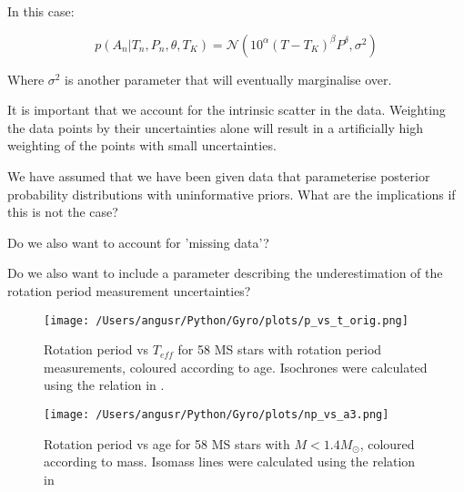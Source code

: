 \documentclass[12pt,preprint]{aastex}
\begin{document}

In this case:

\begin{equation}
	p(A_n|T_n, P_n, \theta, T_K) = \mathcal{N}(10^\alpha (T-T_K)^\beta P^\delta, \sigma^2)
\label{eq:addvar}
\end{equation}

Where $\sigma^2$ is another parameter that will eventually marginalise over.

It is important that we account for the intrinsic scatter in the data. Weighting the data points by their uncertainties alone will result in a artificially high weighting of the points with small uncertainties.

We have assumed that we have been given data that parameterise posterior probability distributions with uninformative priors.
What are the implications if this is not the case?

Do we also want to account for 'missing data'?

Do we also want to include a parameter describing the underestimation of the rotation period measurement uncertainties?

\begin{figure}[ht]
\begin{center}
\texttt{[image: /Users/angusr/Python/Gyro/plots/p\_vs\_t\_orig.png]}
\caption{Rotation period vs $T_{eff}$ for 58 MS stars with rotation period measurements, coloured according to age.
Isochrones were calculated using the relation in  \citet{Mamajek_2008}.}
\label{fig:results}
\end{center}
\end{figure}

\begin{figure}[ht]
\begin{center}
\texttt{[image: /Users/angusr/Python/Gyro/plots/np\_vs\_a3.png]}
\caption{Rotation period vs age for 58 MS stars with $M<1.4M_\odot$, coloured according to mass. %
Isomass lines were calculated using the relation in \citet{Mamajek_2008}}
\label{fig:results2}
\end{center}
\end{figure}
\end{document}
